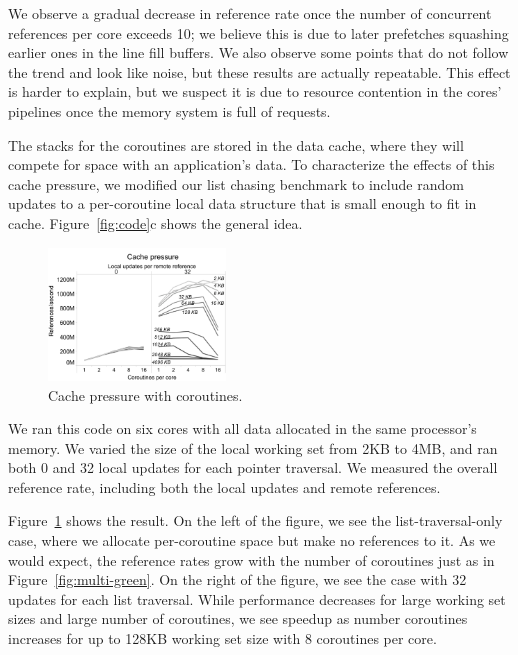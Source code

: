 \documentclass[10pt,nocopyrightspace,preprint]{sigplanconf}
\begin{document}
{We observe a gradual decrease in reference rate once the number of
concurrent references per core exceeds 10; we believe this is due to
later prefetches squashing earlier ones in the line fill buffers. We
also observe some points that do not follow the trend and look like noise, but these results are actually repeatable. This effect is harder to explain, but we suspect it is
due to resource contention in the cores' pipelines once the memory
system is full of requests.



The stacks for the coroutines are stored in the data cache, where they
will compete for space with an application's data. To characterize the
effects of this cache pressure, we modified our list chasing benchmark
to include random updates to a per-coroutine local data structure that
is small enough to fit in cache. Figure~\ref{fig:code}c shows the
general idea.

\begin{figure}[h]
  \begin{center}
    \includegraphics[width=0.42\textwidth]{figures/cache-pressure-edited.pdf}
  \end{center}
  \caption{Cache pressure with coroutines.}
  \label{fig:cache-pressure}
\end{figure}

We ran this code on six cores with all data allocated in the same
processor's memory. We varied the size of the local working set from 2KB
to 4MB, and ran both 0 and 32 local updates for each pointer
traversal. We measured the overall reference rate, including both the local updates and remote references.

Figure~\ref{fig:cache-pressure} shows the result. On the left of the
figure, we see the list-traversal-only case, where we allocate
per-coroutine space but make no references to it. As we would expect,
the reference rates grow with the number of coroutines just as in
Figure~\ref{fig:multi-green}. On the right of the figure, we see the
case with 32 updates for each list traversal. While performance
decreases for large working set sizes and large number of coroutines,
we see speedup as number coroutines increases for up to 128KB working set size with 8 coroutines per
core. 

}
\end{document}
